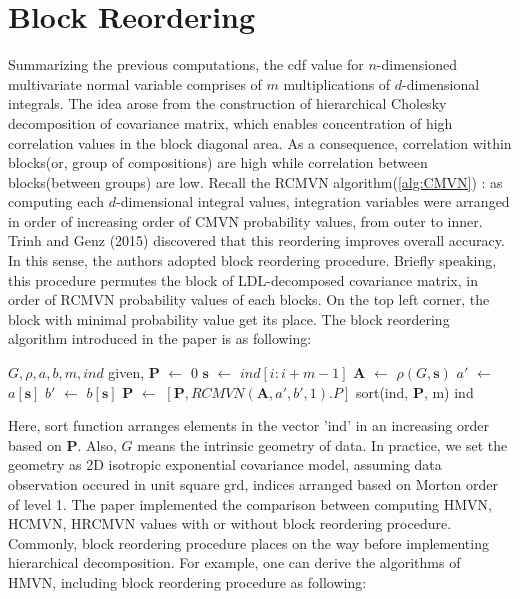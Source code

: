 \section{Block Reordering}

Summarizing the previous computations, the cdf value for $n$-dimensioned multivariate normal variable comprises of $m$ multiplications of $d$-dimensional integrals. The idea arose from the construction of hierarchical Cholesky decomposition of covariance matrix, which enables concentration of high correlation values in the block diagonal area. As a consequence, correlation within blocks(or, group of compositions) are high while correlation between blocks(between groups) are low. Recall the RCMVN algorithm(\ref{alg:CMVN}) : as computing each $d$-dimensional integral values, integration variables were arranged in order of increasing order of CMVN probability values, from outer to inner. Trinh and Genz (2015) discovered that this reordering improves overall accuracy. In this sense, the authors adopted block reordering procedure. Briefly speaking, this procedure permutes the block of LDL-decomposed covariance matrix, in order of RCMVN probability values of each blocks. On the top left corner, the block with minimal probability value get its place. The block reordering algorithm introduced in the paper is as following:\\

	\begin{algorithmic}[1]
		
		\STATE $G, \rho, a, b, m, ind$ given, $\mathbf{P}$ $\leftarrow$ $0$
		\STATE $\mathbf{s}$ $\leftarrow$ $ind[i:i+m-1]$
		\STATE $\mathbf{A}$ $\leftarrow$ $\rho(G, \mathbf{s})$
		\STATE $a'$ $\leftarrow$ $a[\mathbf{s}]$
		\STATE $b'$ $\leftarrow$ $b[\mathbf{s}]$
		\STATE $\mathbf{P}$ $\leftarrow$ $[\mathbf{P}, RCMVN(\mathbf{A},a',b',1).P]$
		\ENDFOR
		\STATE sort(ind, $\mathbf{P}$, m)
		\STATE\RETURN ind

	\end{algorithmic}\label{alg:BR}
Here, sort function arranges elements in the vector 'ind' in an increasing order based on $\mathbf{P}$. Also, $G$ means the intrinsic geometry of data. In practice, we set the geometry as 2D isotropic exponential covariance model, assuming data observation occured in unit square grd, indices arranged based on Morton order of level 1. The paper implemented the comparison between computing HMVN, HCMVN, HRCMVN values with or without block reordering procedure. Commonly, block reordering procedure places on the way before implementing hierarchical decomposition. For example, one can derive the algorithms of HMVN, including block reordering procedure as following:\\ 


